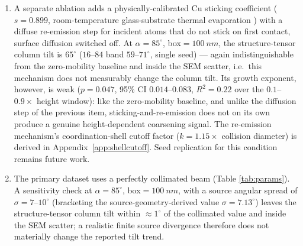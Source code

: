 \documentclass[aip,amsmath,amssymb,reprint]{revtex4-1}
\newcommand{\dang}{\ensuremath{\alpha}}
\begin{document}
\begin{enumerate}
    watershed column-segmentation estimator reported a much larger tilt
    ($\approx81$--$87^{\circ}$) and an apparent increase with lateral box
    size; both are artefacts of that estimator on the near-continuous
    box-$\SI{100}{nm}$ film and do not survive re-measurement. The number of
    hop attempts per growth step is capped for tractability, below the value
    implied by the stated activation energy and attempt frequency at room
    temperature; removing the cap changes the re-measured tilt by less than
    the seed-to-seed scatter. What the diffusion step does add, robustly, is
    genuine height-dependent column coarsening and a non-trivial growth
    exponent, absent from the zero-mobility baseline. Full calibration of the
    diffusion parameters against a controlled Cu observable, and extending
    the primary box/pitch convention to include a diffusion step, remain
    future work.
  \item A separate ablation adds a physically-calibrated Cu sticking
    coefficient ($s=0.899$, room-temperature glass-substrate thermal
    evaporation \citep{chandra1958}) with a diffuse re-emission step for
    incident atoms that do not stick on first contact, surface diffusion
    switched off. At $\dang=85^{\circ}$, box$=\SI{100}{nm}$, the
    structure-tensor column tilt is $65^{\circ}$ ($16$--$84$ band
    $59$--$71^{\circ}$, single seed) --- again indistinguishable from the
    zero-mobility baseline and inside the SEM scatter, i.e.\ this mechanism
    does not measurably change the column tilt. Its growth exponent, however,
    is weak ($p=0.047$, 95\% CI $0.014$--$0.083$, $R^{2}=0.22$ over the
    $0.1$--$0.9\times$ height window): like the zero-mobility baseline, and
    unlike the diffusion step of the previous item, sticking-and-re-emission
    does not on its own produce a genuine height-dependent coarsening
    signal. The re-emission mechanism's coordination-shell cutoff factor
    ($k=1.15\times$ collision diameter) is derived in
    Appendix~\ref{app:shellcutoff}. Seed replication for this condition
    remains future work.
  \item The primary dataset uses a perfectly collimated beam (Table
    \ref{tab:params}). A sensitivity check at $\dang=85^{\circ}$,
    box$=\SI{100}{nm}$, with a source angular spread of $\sigma=7$--$10^{\circ}$
    (bracketing the source-geometry-derived value $\sigma=7.13^{\circ}$)
    leaves the structure-tensor column tilt within $\approx1^{\circ}$ of the
    collimated value and inside the SEM scatter; a realistic finite source
    divergence therefore does not materially change the reported tilt trend.

\end{enumerate}
\end{document}
